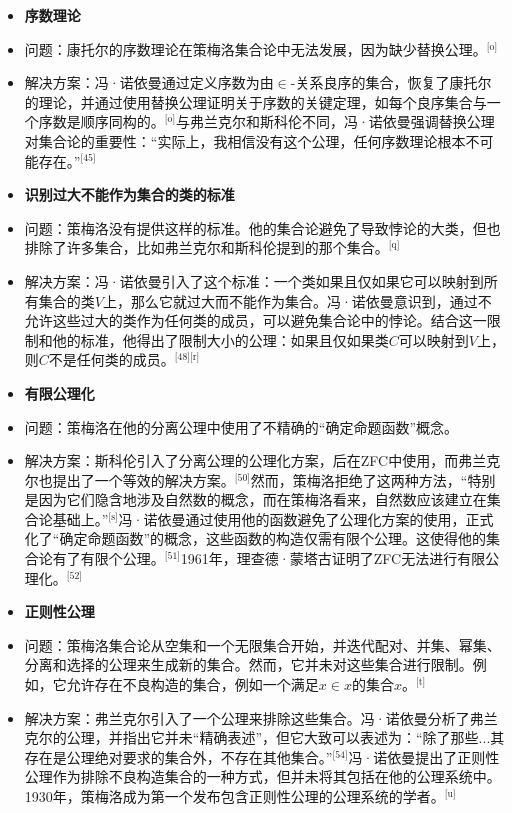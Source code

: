 \begin{itemize}
\item \textbf{序数理论}  
\item 问题：康托尔的序数理论在策梅洛集合论中无法发展，因为缺少替换公理。\(^\text{[o]}\)  
\item 解决方案：冯·诺依曼通过定义序数为由\(\in\)-关系良序的集合，恢复了康托尔的理论，并通过使用替换公理证明关于序数的关键定理，如每个良序集合与一个序数是顺序同构的。\(^\text{[o]}\)与弗兰克尔和斯科伦不同，冯·诺依曼强调替换公理对集合论的重要性：“实际上，我相信没有这个公理，任何序数理论根本不可能存在。”\(^\text{[45]}\)\\
\item \textbf{识别过大不能作为集合的类的标准} 
\item 问题：策梅洛没有提供这样的标准。他的集合论避免了导致悖论的大类，但也排除了许多集合，比如弗兰克尔和斯科伦提到的那个集合。\(^\text{[q]}\)  
\item 解决方案：冯·诺依曼引入了这个标准：一个类如果且仅如果它可以映射到所有集合的类\(V\)上，那么它就过大而不能作为集合。冯·诺依曼意识到，通过不允许这些过大的类作为任何类的成员，可以避免集合论中的悖论。结合这一限制和他的标准，他得出了限制大小的公理：如果且仅如果类\(C\)可以映射到\(V\)上，则\(C\)不是任何类的成员。\(^\text{[48][r]}\)\\
\item \textbf{有限公理化} 
\item 问题：策梅洛在他的分离公理中使用了不精确的“确定命题函数”概念。  
\item 解决方案：斯科伦引入了分离公理的公理化方案，后在ZFC中使用，而弗兰克尔也提出了一个等效的解决方案。\(^\text{[50]}\)然而，策梅洛拒绝了这两种方法，“特别是因为它们隐含地涉及自然数的概念，而在策梅洛看来，自然数应该建立在集合论基础上。”\(^\text{[s]}\)冯·诺依曼通过使用他的函数避免了公理化方案的使用，正式化了“确定命题函数”的概念，这些函数的构造仅需有限个公理。这使得他的集合论有了有限个公理。\(^\text{[51]}\)1961年，理查德·蒙塔古证明了ZFC无法进行有限公理化。\(^\text{[52]}\)\\
\item \textbf{正则性公理}  
\item 问题：策梅洛集合论从空集和一个无限集合开始，并迭代配对、并集、幂集、分离和选择的公理来生成新的集合。然而，它并未对这些集合进行限制。例如，它允许存在不良构造的集合，例如一个满足\(x \in x\)的集合\(x\)。\(^\text{[t]}\)   
\item 解决方案：弗兰克尔引入了一个公理来排除这些集合。冯·诺依曼分析了弗兰克尔的公理，并指出它并未“精确表述”，但它大致可以表述为：“除了那些...其存在是公理绝对要求的集合外，不存在其他集合。”\(^\text{[54]}\)冯·诺依曼提出了正则性公理作为排除不良构造集合的一种方式，但并未将其包括在他的公理系统中。1930年，策梅洛成为第一个发布包含正则性公理的公理系统的学者。\(^\text{[u]}\) 
\end{itemize}
